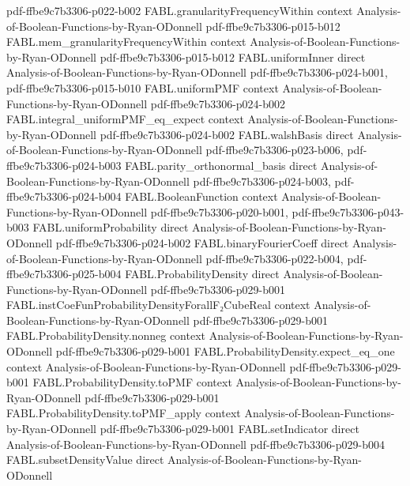 \begin{theorem}
  {pdf-ffbe9c7b3306-p022-b002}
\proofstep
  {FABL.granularityFrequencyWithin}
  {context}
  {Analysis-of-Boolean-Functions-by-Ryan-ODonnell}
  {pdf-ffbe9c7b3306-p015-b012}
\proofstep
  {FABL.mem_granularityFrequencyWithin}
  {context}
  {Analysis-of-Boolean-Functions-by-Ryan-ODonnell}
  {pdf-ffbe9c7b3306-p015-b012}
\proofstep
  {FABL.uniformInner}
  {direct}
  {Analysis-of-Boolean-Functions-by-Ryan-ODonnell}
  {pdf-ffbe9c7b3306-p024-b001,
    pdf-ffbe9c7b3306-p015-b010}
\proofstep
  {FABL.uniformPMF}
  {context}
  {Analysis-of-Boolean-Functions-by-Ryan-ODonnell}
  {pdf-ffbe9c7b3306-p024-b002}
\proofstep
  {FABL.integral_uniformPMF_eq_expect}
  {context}
  {Analysis-of-Boolean-Functions-by-Ryan-ODonnell}
  {pdf-ffbe9c7b3306-p024-b002}
\proofstep
  {FABL.walshBasis}
  {direct}
  {Analysis-of-Boolean-Functions-by-Ryan-ODonnell}
  {pdf-ffbe9c7b3306-p023-b006,
    pdf-ffbe9c7b3306-p024-b003}
\proofstep
  {FABL.parity_orthonormal_basis}
  {direct}
  {Analysis-of-Boolean-Functions-by-Ryan-ODonnell}
  {pdf-ffbe9c7b3306-p024-b003,
    pdf-ffbe9c7b3306-p024-b004}
\proofstep
  {FABL.BooleanFunction}
  {context}
  {Analysis-of-Boolean-Functions-by-Ryan-ODonnell}
  {pdf-ffbe9c7b3306-p020-b001,
    pdf-ffbe9c7b3306-p043-b003}
\proofstep
  {FABL.uniformProbability}
  {direct}
  {Analysis-of-Boolean-Functions-by-Ryan-ODonnell}
  {pdf-ffbe9c7b3306-p024-b002}
\proofstep
  {FABL.binaryFourierCoeff}
  {direct}
  {Analysis-of-Boolean-Functions-by-Ryan-ODonnell}
  {pdf-ffbe9c7b3306-p022-b004,
    pdf-ffbe9c7b3306-p025-b004}
\proofstep
  {FABL.ProbabilityDensity}
  {direct}
  {Analysis-of-Boolean-Functions-by-Ryan-ODonnell}
  {pdf-ffbe9c7b3306-p029-b001}
\proofstep
  {FABL.instCoeFunProbabilityDensityForallF₂CubeReal}
  {context}
  {Analysis-of-Boolean-Functions-by-Ryan-ODonnell}
  {pdf-ffbe9c7b3306-p029-b001}
\proofstep
  {FABL.ProbabilityDensity.nonneg}
  {context}
  {Analysis-of-Boolean-Functions-by-Ryan-ODonnell}
  {pdf-ffbe9c7b3306-p029-b001}
\proofstep
  {FABL.ProbabilityDensity.expect_eq_one}
  {context}
  {Analysis-of-Boolean-Functions-by-Ryan-ODonnell}
  {pdf-ffbe9c7b3306-p029-b001}
\proofstep
  {FABL.ProbabilityDensity.toPMF}
  {context}
  {Analysis-of-Boolean-Functions-by-Ryan-ODonnell}
  {pdf-ffbe9c7b3306-p029-b001}
\proofstep
  {FABL.ProbabilityDensity.toPMF_apply}
  {context}
  {Analysis-of-Boolean-Functions-by-Ryan-ODonnell}
  {pdf-ffbe9c7b3306-p029-b001}
\proofstep
  {FABL.setIndicator}
  {direct}
  {Analysis-of-Boolean-Functions-by-Ryan-ODonnell}
  {pdf-ffbe9c7b3306-p029-b004}
\proofstep
  {FABL.subsetDensityValue}
  {direct}
  {Analysis-of-Boolean-Functions-by-Ryan-ODonnell}

\end{theorem}
